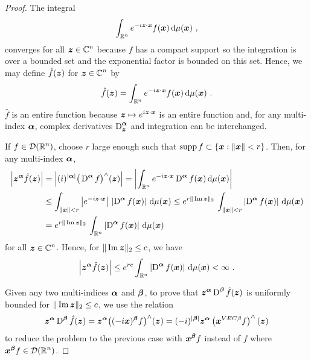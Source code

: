 \begin{proof}
The integral
\[
\int_{\mathbb{R}^n} e^{-i {\bm{z}}\cdot {\bm{x}}} f({\bm{x}}) \,\mathrm{d}{\mu({\bm{x}})} \ ,
\]
converges for all $\displaystyle {\bm{z}} \in \mathbb{C}^n$ because $f$ has a compact
support so the integration is over a bounded set and the
exponential factor is bounded on this set.
Hence, we may define $\hat{f}({\bm{z}})$ for $\displaystyle {\bm{z}} \in \mathbb{C}^n$ by
\[
  \hat{f}(\VEC{z}) =
\int_{\RR^n} e^{-i \VEC{z}\cdot \VEC{x}} f(\VEC{x}) \dx{\mu(\VEC{x})} \ .
\]
$\hat{f}$ is an entire function because
$\displaystyle{\bm{z}} \mapsto  e^{i {\bm{z}}\cdot {\bm{x}}}$ is an entire function
and, for any multi-index ${\bm{\alpha}}$, complex
derivatives $\displaystyle \operatorname{D}_{{\bm{z}}}^{{\bm{\alpha}}}$ and integration
can be interchanged.

If $\displaystyle f \in \mathcal{D}(\mathbb{R}^n)$, choose $r$ large enough such that
$\operatorname{supp} f \subset \{ {\bm{x}} : \|{\bm{x}}\| < r \}$.  Then, for any
multi-index ${\bm{\alpha}}$,
\begin{align}
\left| {\bm{z}}^{{\bm{\alpha}}} \hat{f}({\bm{z}}) \right|
&= \left| (i)^{|{\bm{\alpha}}|} \big(\operatorname{D}^{{\bm{\alpha}}}
f\big)^\wedge({\bm{z}}) \right|
= \left| \int_{\mathbb{R}^n} e^{-i {\bm{z}}\cdot{\bm{x}}} \operatorname{D}^{{\bm{\alpha}}} f({\bm{x}})
  \,\mathrm{d}{\mu({\bm{x}})} \right| \nonumber \\
&\leq \int_{\|{\bm{x}}\| < r} \left| e^{-i {\bm{z}}\cdot{\bm{x}}}\right|\,
\left|\operatorname{D}^{{\bm{\alpha}}} f({\bm{x}})\right| \,\mathrm{d}{\mu({\bm{x}})}
\leq e^{r \|\operatorname{Im} {\bm{z}}\|_2}\,\int_{\|{\bm{x}}\| < r}
\left|\operatorname{D}^{{\bm{\alpha}}} f({\bm{x}})\right| \,\mathrm{d}{\mu({\bm{x}})} \nonumber \\
& = e^{r \|\operatorname{Im} {\bm{z}}\|_2}\,\int_{\mathbb{R}^n}
\left|\operatorname{D}^{{\bm{\alpha}}} f({\bm{x}})\right| \,\mathrm{d}{\mu({\bm{x}})}
\label{proof_distr_four_f} 
\end{align}
for all $\displaystyle {\bm{z}} \in \mathbb{C}^n$.
Hence, for $\|\operatorname{Im} {\bm{z}} \|_2 \leq c$, we have
\[
\left| {\bm{z}}^{{\bm{\alpha}}} \hat{f}({\bm{z}}) \right|
\leq e^{r c}
\int_{\mathbb{R}^n} \left|\operatorname{D}^{{\bm{\alpha}}} f({\bm{x}})\right| \,\mathrm{d}{\mu({\bm{x}})}
< \infty \ .
\]

Given any two multi-indices ${\bm{\alpha}}$ and ${\bm{\beta}}$, to prove that
$\displaystyle {\bm{z}}^{{\bm{\alpha}}} \operatorname{D}^{{\bm{\beta}}} \hat{f}({\bm{z}})$ is
uniformly bounded for $\|\operatorname{Im} {\bm{z}} \|_2 \leq c$, we use the relation
\[
{\bm{z}}^{{\bm{\alpha}}} \operatorname{D}^{{\bm{\beta}}} \hat{f}({\bm{z}}) =
{\bm{z}}^{{\bm{\alpha}}} \big( (-i {\bm{x}})^{{\bm{\beta}}} f\big)^{\wedge} ({\bm{z}})
= (-i)^{|{\bm{\beta}}|} {\bm{z}}^{{\bm{\alpha}}}
\left({\bm{x}}^{VEC{\beta}} f \right)^{\wedge}({\bm{z}})
\]
to reduce the problem to the previous case with
$\displaystyle {\bm{x}}^{{\bm{\beta}}} f$
instead of $f$ where $\displaystyle {\bm{x}}^{{\bm{\beta}}} f \in \mathcal{D}(\mathbb{R}^n)$.
\end{proof}

